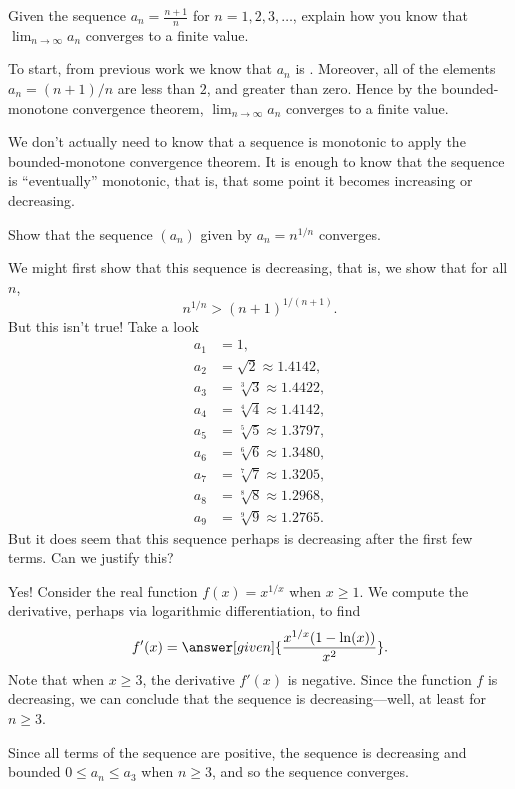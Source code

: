 \documentclass{ximera}
\begin{document}
\begin{example}
  Given the sequence $a_n=\frac{n+1}{n}$ for $n=1,2,3,\dots$,
  explain how you know that $\lim_{n\to\infty} a_n$ converges to a
  finite value.
  \begin{explanation}
    To start, from previous work we know that $a_n$ is
    .
    Moreover, all of the elements $a_n = (n+1)/n$ are less than $2$,
    and greater than zero. Hence by the bounded-monotone convergence
    theorem, $\lim_{n\to\infty} a_n$ converges to a finite value.
  \end{explanation}
\end{example}

We don't actually need to know that a sequence is monotonic to apply
the bounded-monotone convergence theorem. It is enough to know that
the sequence is ``eventually'' monotonic, that is, that some point it
becomes increasing or decreasing.

\begin{example}
Show that the sequence $(a_n)$ given by $a_n = n^{1/n}$ converges.
\begin{explanation}
  We might first show that this sequence is decreasing, that is, we show
  that for all $n$,
  \[
  n^{1/n} > (n+1)^{1/(n+1)}.
  \]
  But this isn't true!  Take a look
  \begin{align*}
    a_1 &= 1, \\
    a_2 &= \sqrt{2} \approx 1.4142, \\
    a_3 &= \sqrt[3]{3} \approx 1.4422, \\
    a_4 &= \sqrt[4]{4} \approx 1.4142, \\
    a_5 &= \sqrt[5]{5} \approx 1.3797, \\
    a_6 &= \sqrt[6]{6} \approx 1.3480, \\
    a_7 &= \sqrt[7]{7} \approx 1.3205, \\
    a_8 &= \sqrt[8]{8} \approx 1.2968, \\
    a_9 &= \sqrt[9]{9} \approx 1.2765.
  \end{align*}
  But it does seem that this sequence perhaps is decreasing after the
  first few terms.  Can we justify this?

  Yes!  Consider the real function $f(x)=x^{1/x}$ when $x\ge 1$.  We
  compute the derivative, perhaps via logarithmic differentiation, to find
  \[
  f'(x)=\answer[given]{\frac{x^{1/x} (1-\ln(x))}{x^2}}.
  \]
  Note that when $x\ge 3$, the derivative $f'(x)$ is negative.  Since
  the function $f$ is decreasing, we can conclude that the sequence is
  decreasing---well, at least for $n \geq 3$.

  Since all terms of the sequence are positive, the sequence is
  decreasing and bounded $0\le a_n \le a_3$ when $n \ge 3$, and so the
  sequence converges.
\end{explanation}
\end{example}
\end{document}
